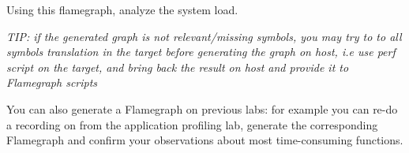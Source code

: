 Using this flamegraph, analyze the system load.

{\em TIP: if the generated graph is not relevant/missing symbols, you may try to to all symbols
translation in the target before generating the graph on host, i.e use perf script on the target,
and bring back the result on host and provide it to Flamegraph scripts}

You can also generate a Flamegraph on previous labs: for example you can re-do a recording on
 from the application profiling lab, generate the corresponding Flamegraph and confirm
your observations about most time-consuming functions.
